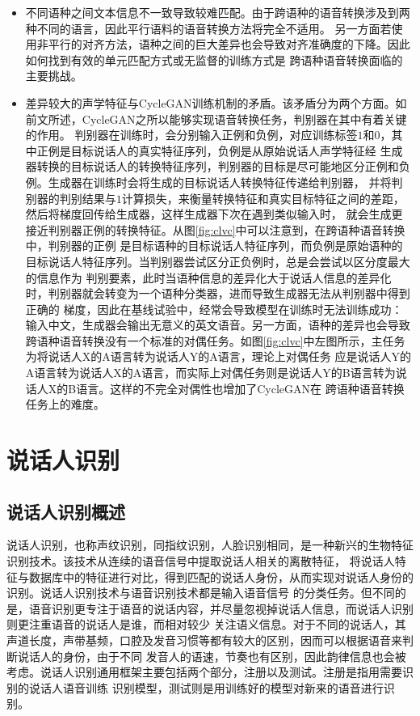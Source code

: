 \begin{itemize}
    \item 不同语种之间文本信息不一致导致较难匹配。由于跨语种的语音转换涉及到两种不同的语言，因此平行语料的语音转换方法将完全不适用。
    另一方面若使用非平行的对齐方法，语种之间的巨大差异也会导致对齐准确度的下降。因此如何找到有效的单元匹配方式或无监督的训练方式是
    跨语种语音转换面临的主要挑战。
    \item 差异较大的声学特征与CycleGAN训练机制的矛盾。该矛盾分为两个方面。如前文所述，CycleGAN之所以能够实现语音转换任务，判别器在其中有着关键的作用。
    判别器在训练时，会分别输入正例和负例，对应训练标签$1$和$0$，其中正例是目标说话人的真实特征序列，负例是从原始说话人声学特征经
    生成器转换的目标说话人的转换特征序列，判别器的目标是尽可能地区分正例和负例。生成器在训练时会将生成的目标说话人转换特征传递给判别器，
    并将判别器的判别结果与$1$计算损失，来衡量转换特征和真实目标特征之间的差距，然后将梯度回传给生成器，这样生成器下次在遇到类似输入时，
    就会生成更接近判别器正例的转换特征。从图\ref{fig:clvc}中可以注意到，在跨语种语音转换中，判别器的正例
    是目标语种的目标说话人特征序列，而负例是原始语种的目标说话人特征序列。当判别器尝试区分正负例时，总是会尝试以区分度最大的信息作为
    判别要素，此时当语种信息的差异化大于说话人信息的差异化时，判别器就会转变为一个语种分类器，进而导致生成器无法从判别器中得到正确的
    梯度，因此在基线试验中，经常会导致模型在训练时无法训练成功：输入中文，生成器会输出无意义的英文语音。另一方面，语种的差异也会导致
    跨语种语音转换没有一个标准的对偶任务。如图\ref{fig:clvc}中左图所示，主任务为将说话人X的A语言转为说话人Y的A语言，理论上对偶任务
    应是说话人Y的A语言转为说话人X的A语言，而实际上对偶任务则是说话人Y的B语言转为说话人X的B语言。这样的不完全对偶性也增加了CycleGAN在
    跨语种语音转换任务上的难度。
\end{itemize}

\section{说话人识别}
\subsection{说话人识别概述}
说话人识别，也称声纹识别，同指纹识别，人脸识别相同，是一种新兴的生物特征识别技术。该技术从连续的语音信号中提取说话人相关的离散特征，
将说话人特征与数据库中的特征进行对比，得到匹配的说话人身份，从而实现对说话人身份的识别。说话人识别技术与语音识别技术都是输入语音信号
的分类任务。但不同的是，语音识别更专注于语音的说话内容，并尽量忽视掉说话人信息，而说话人识别则更注重语音的说话人是谁，而相对较少
关注语义信息。对于不同的说话人，其声道长度，声带基频，口腔及发音习惯等都有较大的区别，因而可以根据语音来判断说话人的身份，由于不同
发音人的语速，节奏也有区别，因此韵律信息也会被考虑。说话人识别通用框架主要包括两个部分，注册以及测试。注册是指用需要识别的说话人语音训练
识别模型，测试则是用训练好的模型对新来的语音进行识别。

